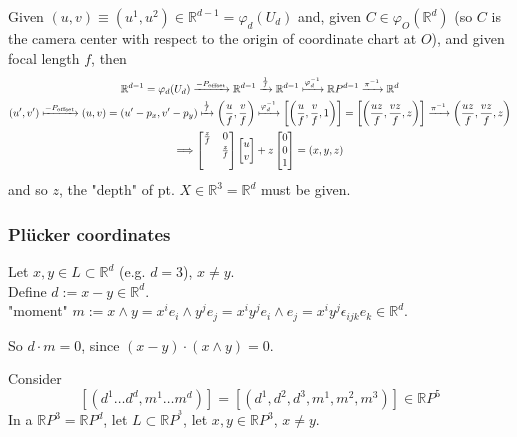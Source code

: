\documentclass[10pt]{amsart}
\begin{document}
\begin{multicols*}{2}
Given $(u,v) \equiv (u^1 ,u^2) \in \mathbb{R}^{d-1} = \varphi_d(U_d)$ and, given $C \in \varphi_O(\mathbb{R}^d)$ (so $C$ is the camera center with respect to the origin of coordinate chart at $O$), and given focal length $f$, then
\[
\begin{gathered}
\mathbb{R}^{d-1} = \varphi_d(U_d) \xrightarrow{ -P_{\text{offset}} } \mathbb{R}^{d-1}  \xrightarrow{ \frac{1}{f} } \mathbb{R}^{d-1} \xmapsto{ \varphi_d^{-1} } \mathbb{R}P^{d-1} \xrightarrow{ \pi^{-1} } \mathbb{R}^d \\
	(u',v') \xmapsto{ -P_{\text{offset}} } (u,v) = (u'-p_x,v'-p_y)  \xmapsto{ \frac{1}{f} } \left( \frac{u}{f}, \frac{v}{f} \right) \xmapsto{ \varphi_d^{-1} } \left[ \left( \frac{u}{f}, \frac{v}{f},1 \right) \right] = \left[ \left( \frac{uz}{f} , \frac{vz}{f} , z \right) \right] \xrightarrow{ \pi^{-1} } \left( \frac{uz}{f}, \frac{vz}{f} , z \right)  \\
\Longrightarrow  \left[ \begin{matrix} \frac{z}{f} & 0 \\  & \frac{z}{f} \\ & \end{matrix} \right] \left[ \begin{matrix} u \\ v \end{matrix} \right] + z \left[ \begin{matrix}  0 \\ 0 \\ 1 \end{matrix} \right] = (x,y,z)
\end{gathered}
\]
and so $z$, the "depth" of pt. $X\in \mathbb{R}^3 = \mathbb{R}^d$ must be given.  



\subsubsection{Pl\"{u}cker coordinates}  

Let $x,y \in L \subset \mathbb{R}^d$ (e.g. $d=3$), $x\neq y$.  \\
Define $d:= x-y \in \mathbb{R}^d$.  \\
"moment" $m:= x\wedge y = x^i e_i \wedge y^j e_j = x^i y^j e_i \wedge e_j = x^i y^j \epsilon_{ijk} e_k \in \mathbb{R}^d$.  

So $d\cdot m =0$, since $(x-y)\cdot (x\wedge y) =0$.  

Consider 
\[
[(d^1\dots d^d,m^1 \dots m^d)] = [(d^1,d^2,d^3,m^1,m^2,m^3)] \in \mathbb{R}P^5
\]
In a $\mathbb{R}P^3 = \mathbb{R}P^d$, let $L\subset \mathbb{R}P^^3$, let $x,y \in \mathbb{R}P^3$, $x\neq y$.  


\end{multicols*}
\end{document}
